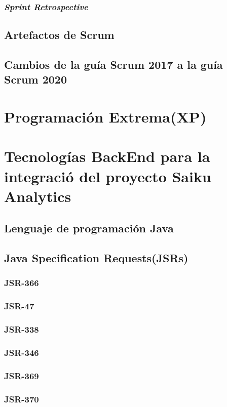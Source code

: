 		\subsubsection{\textit{Sprint Retrospective}}
	\subsection{Artefactos de Scrum}
	\subsection{Cambios de la gu\'{i}a Scrum 2017 a la gu\'{i}a Scrum 2020}

\section{Programaci\'{o}n Extrema(XP)}
		\lipsum[1-2]
\section{Tecnolog\'{i}as BackEnd para la integraci\'{o} del proyecto Saiku Analytics}
		\lipsum[1-2]
	\subsection{Lenguaje de programaci\'{o}n Java}
			\lipsum[1-2]
	\subsection{Java Specification Requests(JSRs)}
		\subsubsection{JSR-366}
				\lipsum[1-2]
		\subsubsection{JSR-47}
				\lipsum[1-2]
		\subsubsection{JSR-338}
				\lipsum[1-2]
		\subsubsection{JSR-346}
				\lipsum[1-2]
		\subsubsection{JSR-369}
				\lipsum[1-2]
		\subsubsection{JSR-370}
		\lipsum[1-2]
